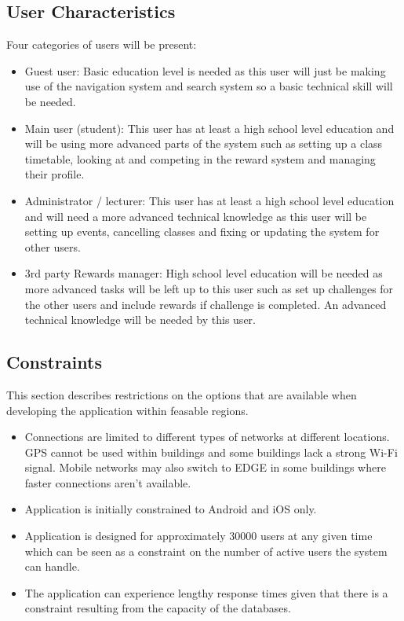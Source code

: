 \documentclass{article}
\begin{document}
	\subsection{User Characteristics}
	Four categories of users will be present:
 		\begin{itemize}
 
 \item Guest user: Basic education level is needed as this user will just be making use of the navigation system and search system so a basic technical skill will be needed.
 \item Main user (student): This user has at least a high school level education and will be using more advanced parts of the system such as setting up a class timetable, looking at and competing in the reward system and managing their profile.
 \item Administrator / lecturer: This user has at least a high school level education and will need a more advanced technical knowledge as this user will be setting up events, cancelling classes and fixing or updating the system for other users.  
 \item 3rd party Rewards manager: High school level education will be needed as more advanced tasks will be left up to this user such as set up challenges for the other users and include rewards if challenge is completed. An advanced technical knowledge will be needed by this user.
 
 	\end{itemize}
	\subsection{Constraints}
		This section describes restrictions on the options that are available when developing the application within feasable regions.
 		\begin{itemize}
 			\item Connections are limited to different types of networks at different locations. GPS cannot be used within buildings and some buildings lack a strong Wi-Fi signal. Mobile networks may also switch to EDGE in some buildings where faster connections aren't available.
 			\item Application is initially constrained to Android and iOS only.
 			\item Application is designed for approximately 30000 users at any given time which can be seen as a constraint on the number of active users the system can handle.
 			\item The application can experience lengthy response times given that there is a constraint resulting from the capacity of the databases.\newline
 		\end{itemize}
 
\end{document}
